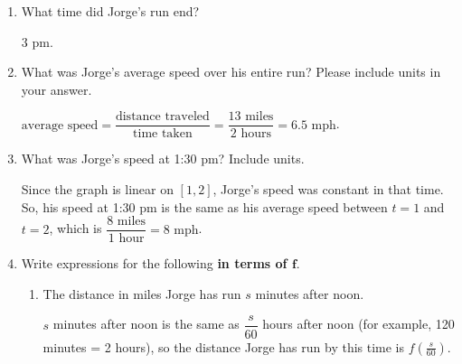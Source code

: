 \documentclass{article}
\renewcommand{\answer}[1]{#1}
\theoremstyle{theorem}
\begin{document}
\begin{enumerate}
\begin{enumerate}
  \item
    \begin{problem}[\vfill]
      What time did Jorge's run end?
    \end{problem}

    \begin{solution}
      \answer{3 pm}. 
    \end{solution}

  \item
    \begin{problem}[\vfill]
      What was Jorge's average speed over his entire run? Please include units in your answer.
    \end{problem}

    \begin{solution}
      $\text{average speed} = \dfrac{\text{distance traveled}}{\text{time taken}} = \dfrac{13 \text{ miles}}{2 \text{ hours}} = \boxed{6.5 \text{ mph}}$. 
    \end{solution}

  \item
    \begin{problem}[\vfill]
      What was Jorge's speed at 1:30 pm? Include units.
    \end{problem}

    \begin{solution}
      Since the graph is linear on $[1, 2]$, Jorge's speed was constant in that time. So, his speed at 1:30 pm is the same as his average speed between $t = 1$ and $t = 2$, which is $\dfrac{8 \text{ miles}}{1 \text{ hour}} = \boxed{8 \text{ mph}}$. 
    \end{solution}

  \item Write expressions for the following \textbf{in terms of $\bm{f}$}.

    \begin{enumerate}
    \item
      \begin{problem}[\vfill]
        The distance in miles Jorge has run $s$ minutes after noon.
      \end{problem}

      \begin{solution}
        $s$ minutes after noon is the same as $\dfrac{s}{60}$ hours after noon (for example, 120 minutes = 2 hours), so the distance Jorge has run by this time is $\boxed{f \left( \frac{s}{60} \right)}$. 
      \end{solution}


\end{enumerate}
\end{enumerate}
\end{enumerate}
\end{document}
